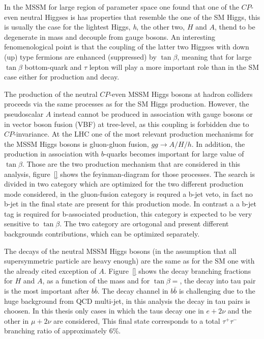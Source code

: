 In the MSSM for large region of parameter space one found that one of the 
$CP$-even neutral Higgses is has properties that resemble the one of the SM Higgs,
this is usually the case for the lightest Higgs, \emph{h}, the other two, $H$ and $A$, 
thend to be degenerate in mass and decouple from gauge bosons.
An interesting fenomenological point is that the coupling of the latter
two Higgses with down (up) type fermions are enhanced
(suppressed) by $\tan\beta$, meaning that for large $\tan\beta$
bottom-quark and $\tau$ lepton will play a more important role than in
the SM case either for production and decay.

The production of the neutral $CP$-even MSSM Higgs bosons at hadron
colliders proceeds via the same processes as for the SM Higgs
production. However, the pseudoscalar $A$ instead cannot be produced
in association with gauge bosons or in vector boson fusion (VBF) at
tree-level, as this coupling is forbidden due to $CP$-invariance.  At
the LHC one of the most relevant production mechanisms for the MSSM
Higgs bosons is gluon-gluon fusion, $gg\rightarrow A/H/h$. In
addition, the production in association with $b$-quarks becomes
important for large value of $\tan\beta$. Those are the two production mechanism
that are considered in this analysis, figure~\ref{} shows the feyinman-diagram
for those processes. The search is divided in two category which are optimized
for the two different production mode considered, in the gluon-fusion category
is requred a b-jet veto, in fact no b-jet in the final state are present for this
production mode. In contrast a a b-jet tag is required for b-associated production,
this category is expected to be very sensitive to $\tan\beta$. The two category are
ortogonal and present different backgrounds contributions, which can be
optimized separately. 

The decays of the neutral
MSSM Higgs bosons (in the assumption that all supersymmetric particle
are heavy enough) are the same as for the SM one with the already
cited exception of $A$. Figure~\ref{} shows the decay branching fractions
for $H$ and $A$, as a function of the mass and for $\tan\beta = $, 
the decay into tau pair is the most important after $b\bar{b}$. The 
decay channel in $b\bar{b}$ is challenging due to the huge background from
QCD multi-jet, in this analysis the decay in tau pairs is choosen.
In this thesis only cases in which the taus decay one in $e + 2\nu$ and
the other in $\mu + 2\nu$ are considered, This final state corresponds to a total
$\tau^+\tau^-$ branching ratio of approximately 6\%.
 
